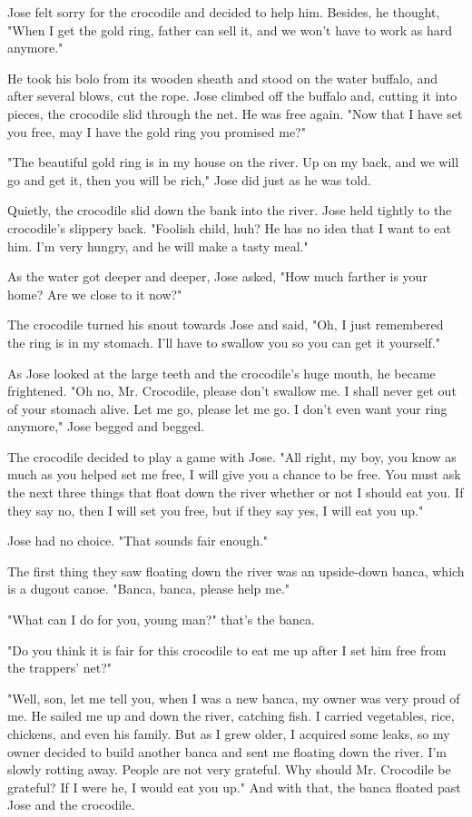 Jose felt sorry for the crocodile and decided to help him. Besides, he thought, "When I get the gold ring, father can sell it, and we won't have to work as hard anymore."

He took his bolo from its wooden sheath and stood on the water buffalo, and after several blows, cut the rope. Jose climbed off the buffalo and, cutting it into pieces, the crocodile slid through the net. He was free again. "Now that I have set you free, may I have the gold ring you promised me?"

"The beautiful gold ring is in my house on the river. Up on my back, and we will go and get it, then you will be rich," Jose did just as he was told.

Quietly, the crocodile slid down the bank into the river. Jose held tightly to the crocodile's slippery back. "Foolish child, huh? He has no idea that I want to eat him. I'm very hungry, and he will make a tasty meal."

As the water got deeper and deeper, Jose asked, "How much farther is your home? Are we close to it now?"

The crocodile turned his snout towards Jose and said, "Oh, I just remembered the ring is in my stomach. I'll have to swallow you so you can get it yourself."

As Jose looked at the large teeth and the crocodile's huge mouth, he became frightened. "Oh no, Mr. Crocodile, please don't swallow me. I shall never get out of your stomach alive. Let me go, please let me go. I don't even want your ring anymore," Jose begged and begged.

The crocodile decided to play a game with Jose. "All right, my boy, you know as much as you helped set me free, I will give you a chance to be free. You must ask the next three things that float down the river whether or not I should eat you. If they say no, then I will set you free, but if they say yes, I will eat you up."

Jose had no choice. "That sounds fair enough."

The first thing they saw floating down the river was an upside-down banca, which is a dugout canoe. "Banca, banca, please help me."

"What can I do for you, young man?" that's the banca.

"Do you think it is fair for this crocodile to eat me up after I set him free from the trappers' net?"

"Well, son, let me tell you, when I was a new banca, my owner was very proud of me. He sailed me up and down the river, catching fish. I carried vegetables, rice, chickens, and even his family. But as I grew older, I acquired some leaks, so my owner decided to build another banca and sent me floating down the river. I'm slowly rotting away. People are not very grateful. Why should Mr. Crocodile be grateful? If I were he, I would eat you up." And with that, the banca floated past Jose and the crocodile.

